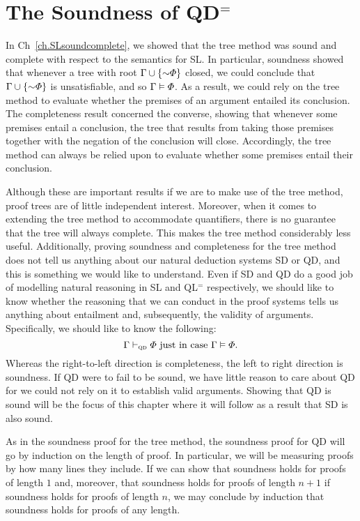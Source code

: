 ﻿%
\chapter{The Soundness of QD$^=$}
  \label{ch.SoundQD}

In Ch~\ref{ch.SLsoundcomplete}, we showed that the tree method was sound and complete with respect to the semantics for SL.
In particular, soundness showed that whenever a tree with root $\Gamma\cup\set{\enot\metaA}$ closed, we could conclude that $\Gamma\cup\set{\enot\metaA}$ is unsatisfiable, and so $\Gamma \vDash \varPhi$.
As a result, we could rely on the tree method to evaluate whether the premises of an argument entailed its conclusion.
The completeness result concerned the converse, showing that whenever some premises entail a conclusion, the tree that results from taking those premises together with the negation of the conclusion will close.
Accordingly, the tree method can always be relied upon to evaluate whether some premises entail their conclusion.

Although these are important results if we are to make use of the tree method, proof trees are of little independent interest.
Moreover, when it comes to extending the tree method to accommodate quantifiers, there is no guarantee that the tree will always complete.
This makes the tree method considerably less useful.
Additionally, proving soundness and completeness for the tree method does not tell us anything about our natural deduction systems SD or QD, and this is something we would like to understand.
Even if SD and QD do a good job of modelling natural reasoning in SL and QL$^=$ respectively, we should like to know whether the reasoning that we can conduct in the proof systems tells us anything about entailment and, subsequently, the validity of arguments.
Specifically, we should like to know the following: 
  $$\Gamma \vdash_{\textsc{qd}} \varPhi \text{ just in case } \Gamma \vDash \varPhi.$$
Whereas the right-to-left direction is completeness, the left to right direction is soundness.
If QD were to fail to be sound, we have little reason to care about QD for we could not rely on it to establish valid arguments.
Showing that QD is sound will be the focus of this chapter where it will follow as a result that SD is also sound.

As in the soundness proof for the tree method, the soundness proof for QD will go by induction on the length of proof.
In particular, we will be measuring proofs by how many lines they include.
If we can show that soundness holds for proofs of length $1$ and, moreover, that soundness holds for proofs of length $n+1$ if soundness holds for proofs of length $n$, we may conclude by induction that soundness holds for proofs of any length.




